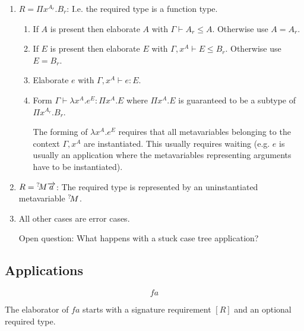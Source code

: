 \begin{enumerate}
    \item $R = \Pi x^{A_r}. B_r$: I.e. the required type is a function type.

        \begin{enumerate}
            \item If $A$ is present then elaborate $A$ with $\Gamma \vdash A_r
                \le A$. Otherwise use $A = A_r$.

            \item If $E$ is present then elaborate $E$
                with $\Gamma, x^A \vdash E \le B_r$. Otherwise use $E = B_r$.

            \item Elaborate $e$ with $\Gamma, x^A \vdash e: E$.

            \item Form $\Gamma \vdash \lambda x^A. e^E : \Pi x^A. E$ where $\Pi
                x^A. E$ is guaranteed to be a subtype of $\Pi x^{A_r}. B_r$.

                The forming of $\lambda x^A. e^E$ requires that all
                metavariables belonging to the context $\Gamma, x^A$ are
                instantiated. This usually requires waiting (e.g. $e$ is usually
                an application where the metavariables representing arguments
                have to be instantiated).
        \end{enumerate}

    \item $R = {{}^? \kern-0.2em M} {\overrightarrow {a}}$: The required type is represented by an
        uninstantiated metavariable ${{}^? \kern-0.2em M}$.

    \item All other cases are error cases.

        Open question: What happens with a stuck case tree application?
\end{enumerate}





\subsection{Applications}

$$ f a$$


The elaborator of $f a$ starts with a signature requirement $[R]$ and
an optional required type.

